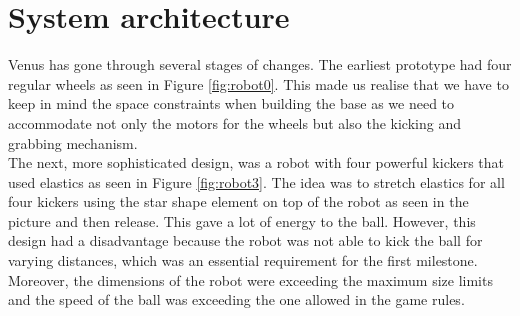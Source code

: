 \documentclass[a4paper,12pt]{article}
\begin{document}
\tableofcontents

\newpage

\section{System architecture}

Venus has gone through several stages of changes. The earliest prototype had four regular wheels as seen in Figure \ref{fig:robot0}. This made us realise that we have to keep in mind the space
constraints when building the base as we need to accommodate not only the motors
for the wheels but also the kicking and grabbing mechanism. 
\\The next, more sophisticated design, was a robot with four powerful kickers that used elastics as seen in Figure \ref{fig:robot3}. The idea was to stretch elastics for all four kickers using the star shape element on top of the robot as seen in the picture and then release. This gave a lot of energy to the ball. However, this design had a disadvantage because the robot was not able to kick the ball for varying distances, which was an essential requirement for the first milestone. Moreover, the dimensions of the robot were exceeding the maximum size limits and the speed of the ball was exceeding the one allowed in the game rules. 
\end{document}
